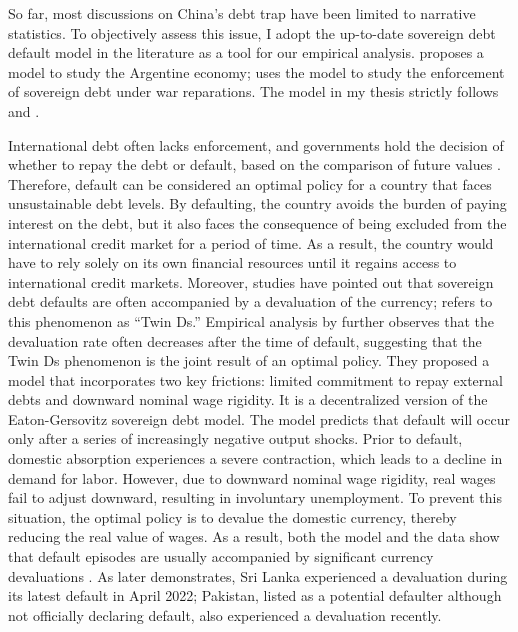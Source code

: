 So far, most discussions on China's debt trap have been limited to narrative statistics.
To objectively assess this issue, I adopt the up-to-date sovereign debt default model in the literature as a tool for our empirical analysis. \citet{Na-18} proposes a model to study the Argentine economy; \citet*{Hinrichsen_2020-chapter4} uses the model to study the enforcement of sovereign debt under war reparations.
The model in my thesis strictly follows \citet{Na-18} and \citet*{Hinrichsen_2020-chapter4}.

International debt often lacks enforcement, and governments hold the decision of whether to repay the debt or default, based on the comparison of future values \citep*{Eaton-Gersovitz-81}. Therefore, default can be considered an optimal policy for a country that faces unsustainable debt levels. By defaulting, the country avoids the burden of paying interest on the debt, but it also faces the consequence of being excluded from the international credit market for a period of time. As a result, the country would have to rely solely on its own financial resources until it regains access to international credit markets.
Moreover, studies have pointed out that sovereign debt defaults are often accompanied by a devaluation of the currency; \citet*{Reinhart02} refers to this phenomenon as ``Twin Ds.''
Empirical analysis by \citet{Na-18} further observes that the devaluation rate often decreases after the time of default, suggesting that the Twin Ds phenomenon is the joint result of an optimal policy.
They proposed a model that incorporates two key frictions: limited commitment to repay external debts and downward nominal wage rigidity.
It is a decentralized version of the Eaton-Gersovitz sovereign debt model.
The model predicts that default will occur only after a series of increasingly negative output shocks. Prior to default, domestic absorption experiences a severe contraction, which leads to a decline in demand for labor. However, due to downward nominal wage rigidity, real wages fail to adjust downward, resulting in involuntary unemployment. To prevent this situation, the optimal policy is to devalue the domestic currency, thereby reducing the real value of wages. As a result, both the model and the data show that default episodes are usually accompanied by significant currency devaluations \citep*{Na-18}.
As later demonstrates, Sri Lanka experienced a devaluation during its latest default in April 2022; Pakistan, listed as a potential defaulter although not officially declaring default, also experienced a devaluation recently.

